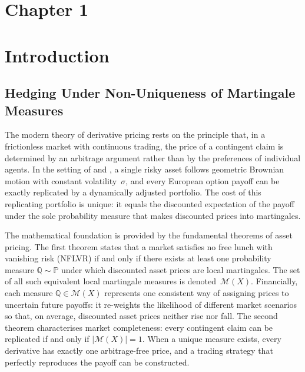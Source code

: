 

\clearpage
\section*{Chapter 1}
\section{Introduction}
\label{sec:introduction}


\subsection{Hedging Under Non-Uniqueness of Martingale Measures}
\label{subsec:hedging_motivation}

The modern theory of derivative pricing rests on the principle that, in a
frictionless market with continuous trading, the price of a contingent
claim is determined by an arbitrage argument rather than by the
preferences of individual agents.  In the setting of
\citet{BlackScholes1973} and \citet{Merton1973}, a single risky asset
follows geometric Brownian motion with constant volatility~$\sigma$, and
every European option payoff can be exactly replicated by a dynamically
adjusted portfolio.  The cost of this replicating portfolio is unique: it
equals the discounted expectation of the payoff under the sole probability
measure that makes discounted prices into martingales.

The mathematical foundation is provided by the fundamental theorems of
asset pricing.  The first theorem \citep{DelbaenSchachermayer1994} states
that a market satisfies no free lunch with vanishing risk (NFLVR) if and
only if there exists at least one probability measure
$\mathbb{Q} \sim \mathbb{P}$ under which discounted asset prices are local
martingales.  The set of all such equivalent local martingale measures is
denoted~$\mathcal{M}(X)$.  Financially, each measure
$\mathbb{Q} \in \mathcal{M}(X)$ represents one consistent way of
assigning prices to uncertain future payoffs: it re-weights the likelihood
of different market scenarios so that, on average, discounted asset prices
neither rise nor fall.  The second theorem
\citep{HarrisonPliska1981, HarrisonKreps1979} characterises market
completeness: every contingent claim can be replicated if and only if
$|\mathcal{M}(X)| = 1$.  When a unique measure exists, every derivative
has exactly one arbitrage-free price, and a trading strategy that
perfectly reproduces the payoff can be constructed.


